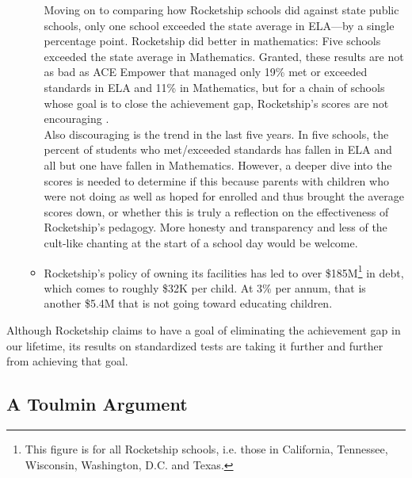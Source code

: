 \begin{enumerate}[topsep=0.3\baselineskip,itemsep=0.25\baselineskip]
\begin{itemize}[topsep=0.125\baselineskip,itemsep=0.25\baselineskip]
      Moving on to comparing how Rocketship schools did against state public schools, only one school exceeded the state average in ELA—by a single percentage point. Rocketship did better in mathematics: Five schools exceeded the state average in Mathematics. Granted, these results are not as bad as ACE Empower that managed only 19\% met or exceeded standards in ELA and 11\% in Mathematics, but for a chain of schools whose goal is to close the achievement gap, Rocketship's scores are not encouraging \parencite{SCCOE2014}.\\
      Also discouraging is the trend in the last five years. In five schools, the percent of students who met/exceeded standards has fallen in ELA and all but one have fallen in Mathematics. However, a deeper dive into the scores is needed to determine if this because parents with children who were not doing as well as hoped for enrolled and thus brought the average scores down, or whether this is truly a reflection on the effectiveness of Rocketship's pedagogy. More honesty and transparency and less of the cult-like chanting at the start of a school day would be welcome.
      \item Rocketship's policy of owning its facilities has led to over \$185M\footnote{This figure is for all Rocketship schools, i.e. those in  California, Tennessee, Wisconsin, Washington, D.C. and Texas.} in debt, which comes to roughly \$32K per child. At 3\% per annum, that is another \$5.4M that is not going toward educating children.
    \end{itemize}

  \end{enumerate}

Although Rocketship claims to have a goal of eliminating the achievement gap in our lifetime, its results on standardized tests are taking it further and further from achieving that goal.

\subsection{A Toulmin Argument}%
\label{sec:toulmin-arguments}\indent%

